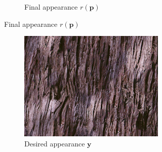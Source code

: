 \begin{figure}[]
\begin{subfigure}{\textwidth}
\begin{subfigure}{0.78\textwidth}
\begin{subfigure}{0.32\textwidth}
            \end{subfigure}
            \caption*{Final appearance \(r(\bm{p})\)}
        \end{subfigure}
    \end{subfigure}

    \begin{subfigure}{\textwidth}
        \centering
        \begin{subfigure}{0.2\textwidth}
            \centering
            \includegraphics[width=\textwidth]{images/04-experiment02/sofa/wood/target.jpg}
            \caption*{Desired appearance \(\bm{y}\)}
        \end{subfigure}
        \hfill
        \begin{subfigure}{0.78\textwidth}
            \centering
            \begin{subfigure}{0.32\textwidth}
                \centering
                \begin{tikzpicture}

\end{tikzpicture}
\end{subfigure}
\end{subfigure}
\end{subfigure}
\end{figure}
